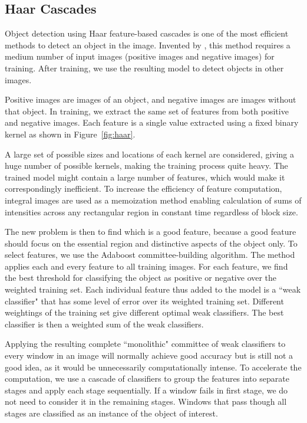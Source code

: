 \subsection{Haar Cascades}
Object detection using Haar feature-based cascades is one of the most efficient methods to detect an object in the image. Invented by , this method requires a medium number of input images (positive images and negative images) for training. After training, we use the resulting model to detect objects in other images.

Positive images are images of an object, and negative images are images without that object. In training, we extract the same set of features from both positive and negative images. Each feature is a single value extracted using a fixed binary kernel as shown in Figure~\ref{fig:haar}.

A large set of possible sizes and locations of each kernel are considered, giving a huge number of possible kernels, making the training process quite heavy. The trained model might contain a large number of features, which would make it correspondingly inefficient. To increase the efficiency of feature computation, integral images are used as a memoization method enabling calculation of sums of intensities across any rectangular region in constant time regardless of block size. 

The new problem is then to find which is a good feature, because a good feature should focus on the essential region and distinctive aspects of the object only. To select features, we use the Adaboost committee-building algorithm. The method applies each and every feature to all training images. For each feature, we find the best threshold for classifying the object as positive or negative over the weighted training set. Each individual feature thus added to the model is a \textquotedblleft weak classifier" that has some level of error over its weighted training set. Different weightings of the training set give different optimal weak classifiers. The best classifier is then a weighted sum of the weak classifiers. 

Applying the resulting complete \textquotedblleft monolithic" committee of weak classifiers to every window in an image will normally achieve good accuracy but is still not a good idea, as it would be unnecessarily computationally intense. To accelerate the computation, we use a cascade of classifiers to group the features into separate stages and apply each stage sequentially. If a window fails in first stage, we do not need to consider it in the remaining stages. Windows that pass though all stages are classified as an instance of the object of interest.

